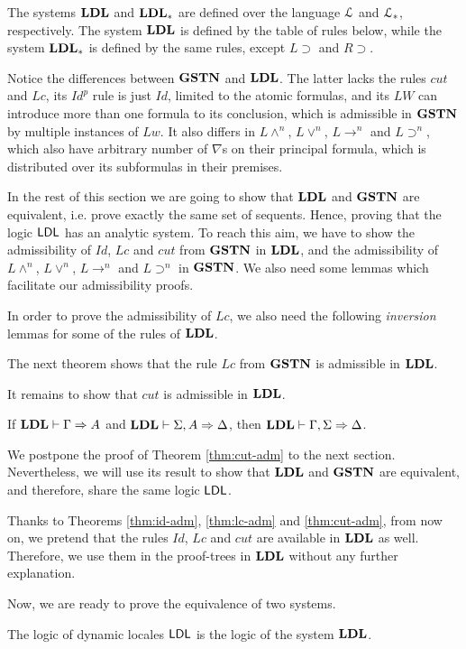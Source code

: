 The systems $\mathbf{LDL}$ and $\mathbf{LDL}_*$ are defined over the language $\mathcal{L}$ and $\mathcal{L}_*$, respectively. The system $\mathbf{LDL}$ is defined by the table of rules below, while the system $\mathbf{LDL}_*$ is defined by the same rules, except $L \supset$ and $R \supset$.


\begin{rem}\label{rem:ldl-gstn}
  Notice the differences between $\mathbf{GSTN}$ and $\mathbf{LDL}$. The latter lacks the rules $cut$ and $Lc$, its $Id ^p$ rule is just $Id$, limited to the atomic formulas, and its $LW$ can introduce more than one formula to its conclusion, which is admissible in $\mathbf{GSTN}$ by multiple instances of $Lw$. It also differs in $L \wedge ^n$, $L \vee ^n$, $L \rightarrow ^n$ and $L \supset ^n$, which also have arbitrary number of $\nabla$s on their principal formula, which is distributed over its subformulas in their premises.  
\end{rem}

In the rest of this section we are going to show that $\mathbf{LDL}$ and $\mathbf{GSTN}$ are equivalent, i.e. prove exactly the same set of sequents. Hence, proving that the logic $\mathsf{LDL}$ has an analytic system. To reach this aim, we have to show the admissibility of $Id$, $Lc$ and $cut$ from $\mathbf{GSTN}$ in $\mathbf{LDL}$, and the admissibility of $L \wedge ^n$, $L \vee ^n$, $L \rightarrow ^n$ and $L \supset ^n$ in $\mathbf{GSTN}$. We also need some lemmas which facilitate our admissibility proofs.





In order to prove the admissibility of $Lc$, we also need the following \emph{inversion} lemmas for some of the rules of $\mathbf{LDL}$.


The next theorem shows that the rule $Lc$ from $\mathbf{GSTN}$ is admissible in $\mathbf{LDL}$.


It remains to show that $cut$ is admissible in $\mathbf{LDL}$.

\begin{thm}\label{thm:cut-adm}
  If $\mathbf{LDL} \vdash \Gamma \Rightarrow A$ and $\mathbf{LDL} \vdash \Sigma, A \Rightarrow \Delta$, then $\mathbf{LDL} \vdash \Gamma, \Sigma \Rightarrow \Delta$.
\end{thm}

We postpone the proof of Theorem \ref{thm:cut-adm} to the next section. Nevertheless, we will use its result to show that $\mathbf{LDL}$ and $\mathbf{GSTN}$ are equivalent, and therefore, share the same logic $\mathsf{LDL}$.

\begin{nota}
  Thanks to Theorems \ref{thm:id-adm}, \ref{thm:lc-adm} and \ref{thm:cut-adm}, from now on, we pretend that the rules $Id$, $Lc$ and $cut$ are available in $\mathbf{LDL}$ as well. Therefore, we use them in the proof-trees in $\mathbf{LDL}$ without any further explanation.
\end{nota}

Now, we are ready to prove the equivalence of two systems.



\begin{cor}
  The logic of dynamic locales $\mathsf{LDL}$ is the logic of the system $\mathbf{LDL}$.
\end{cor}